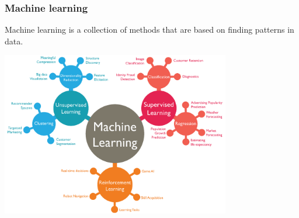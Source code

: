 \begin{frame}
\frametitle{Machine learning}

Machine learning is a collection of methods that are based on finding patterns in data.

   \begin{center}
   \includegraphics[width=0.75\textwidth]{./misc_images/machine-learning}
   \end{center}

\end{frame}